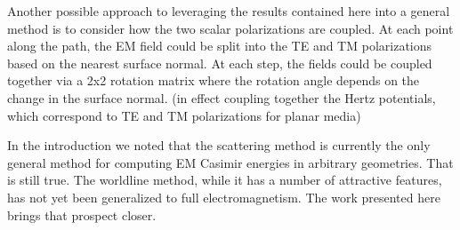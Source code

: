 Another possible approach to leveraging the results contained here into a general method is to consider 
how the two scalar polarizations are coupled.  
At each point along the path, the EM field could be split into the TE and TM polarizations based 
on the nearest surface normal.
At each step, the fields could be coupled together via a 2x2 rotation matrix where the rotation
angle depends on the change in the surface normal.  
(in effect coupling together the Hertz potentials, which correspond to TE and TM polarizations for planar
media)

In the introduction we noted that the scattering method is currently the only general
method for computing EM Casimir energies in arbitrary geometries.  That is still true.  The worldline method,
while it has a number of attractive features, has not yet been generalized to full electromagnetism.   
The work presented here brings that prospect closer.  

    
    
